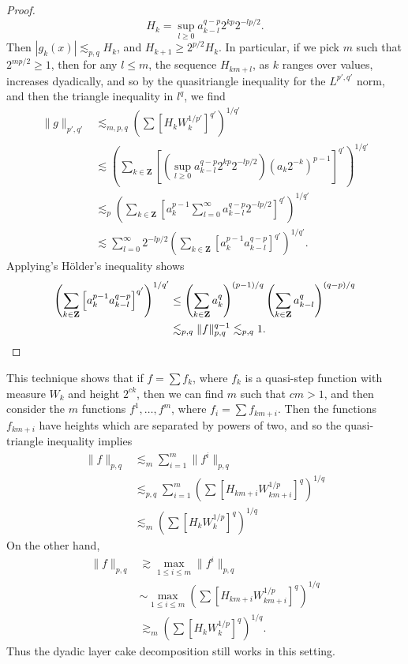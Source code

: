 \begin{proof}
    \[ H_k = \sup_{l \geq 0} a_{k-l}^{q-p} 2^{kp} 2^{-lp/2}. \]
    Then $|g_k(x)| \lesssim_{p,q} H_k$, and $H_{k+1} \geq 2^{p/2} H_k$. In particular, if we pick $m$ such that $2^{mp/2} \geq 1$, then for any $l \leq m$, the sequence $H_{km + l}$, as $k$ ranges over values, increases dyadically, and so by the quasitriangle inequality for the $L^{p',q'}$ norm, and then the triangle inequality in $l^q$, we find
    \begin{align*}
        \| g \|_{p',q'} &\lesssim_{m,p,q} \left( \sum [H_k W_k^{1/p'}]^{q'} \right)^{1/q'}\\
        &\lesssim \left( \sum_{k \in \mathbf{Z}} \left[ \left( \sup_{l \geq 0} a_{k-l}^{q-p} 2^{kp} 2^{-lp/2} \right) (a_k 2^{-k})^{p-1} \right]^{q'} \right)^{1/q'}\\
        &\lesssim_p \left( \sum_{k \in \mathbf{Z}} \left[ a_k^{p-1} \sum_{l = 0}^\infty a_{k-l}^{q-p} 2^{-lp/2} \right]^{q'} \right)^{1/q'}\\
        &\lesssim \sum_{l = 0}^\infty 2^{-lp/2} \left( \sum_{k \in \mathbf{Z}} \left[ a_k^{p-1} a_{k-l}^{q-p} \right]^{q'} \right)^{1/q'}.
    \end{align*}
    Applying's H\"{o}lder's inequality shows
    \begin{align*}
        \left( \sum_{k \in \mathbf{Z}} \left[ a_k^{p-1} a_{k-l}^{q-p} \right]^{q'} \right)^{1/q'} &\leq  \left( \sum_{k \in \mathbf{Z}} a_k^q \right)^{(p-1)/q} \left( \sum_{k \in \mathbf{Z}} a_{k-l}^q \right)^{(q-p)/q}\\
        &\lesssim_{p,q} \| f \|_{p,q}^{q-1} \lesssim_{p,q} 1. \qedhere
    \end{align*}
\end{proof}

\begin{remark}
    This technique shows that if $f = \sum f_k$, where $f_k$ is a quasi-step function with measure $W_k$ and height $2^{ck}$, then we can find $m$ such that $cm > 1$, and then consider the $m$ functions $f^1, \dots, f^m$, where $f_i = \sum f_{km + i}$. Then the functions $f_{km + i}$ have heights which are separated by powers of two, and so the quasi-triangle inequality implies
    \begin{align*}
        \| f \|_{p,q} &\lesssim_m \sum_{i = 1}^m \| f^i \|_{p,q}\\
        &\lesssim_{p,q} \sum_{i = 1}^m \left( \sum \left[ H_{km + i} W_{km + i}^{1/p} \right]^q \right)^{1/q}\\
        &\lesssim_m \left( \sum \left[ H_k W_k^{1/p} \right]^q \right)^{1/q}
    \end{align*}
    On the other hand,
    \begin{align*}
        \| f \|_{p,q} &\gtrsim \max_{1 \leq i \leq m} \| f^i \|_{p,q}\\
        &\sim \max_{1 \leq i \leq m} \left( \sum \left[ H_{km + i} W_{km + i}^{1/p} \right]^q \right)^{1/q}\\
        &\gtrsim_m \left( \sum \left[ H_k W_k^{1/p} \right]^q \right)^{1/q}.
    \end{align*}
    Thus the dyadic layer cake decomposition still works in this setting.
\end{remark}

